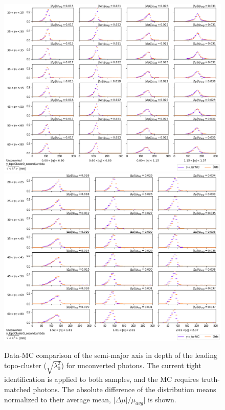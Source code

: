 \begin{figure}[!thp]
    \centering
    \includegraphics[width=.74\textwidth]{chapters/chapter4_photonID/images/y_topoCluster0_secondLambda_Unconverted_lowerEta.png}
    \includegraphics[width=.74\textwidth]{chapters/chapter4_photonID/images/y_topoCluster0_secondLambda_Unconverted_upperEta.png}
    \caption[Data-MC comparison of the semi-major axis in depth of the leading topo-cluster ($\sqrt{\lambda_0^2}$) for unconverted photons]{Data-MC comparison of the semi-major axis in depth of the leading topo-cluster ($\sqrt{\lambda_0^2}$) for unconverted photons. The current tight identification is applied to both samples, and the \gls{MC} requires truth-matched photons. The absolute difference of the distribution means normalized to their average mean, $|\Delta \mu|/\mu_{avg}|$ is shown.}
    \label{fig:data-mc-secondLambda}
\end{figure}
